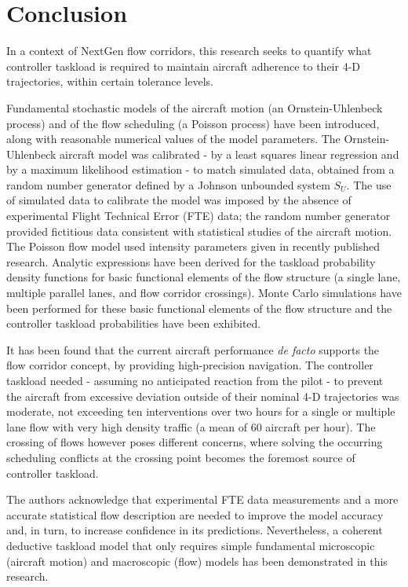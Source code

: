 \documentclass[conference]{IEEEtran}
\begin{document}
\section{Conclusion}

In a context of NextGen flow corridors, this research seeks to quantify what controller taskload is required to maintain aircraft adherence to their 4-D trajectories, within certain tolerance levels.

Fundamental stochastic models of the aircraft motion (an Ornstein-Uhlenbeck process) and of the flow scheduling (a Poisson process) have been introduced, along with reasonable numerical values of the model parameters. The Ornstein-Uhlenbeck aircraft model was calibrated - by a least squares linear regression and by a maximum likelihood estimation - to match simulated data, obtained from a random number generator defined by a Johnson unbounded system $S_U$. The use of simulated data to calibrate the model was imposed by the absence of experimental Flight Technical Error (FTE) data; the random number generator provided fictitious data consistent with statistical studies of the aircraft motion. The Poisson flow model used intensity parameters given in recently published research. Analytic expressions have been derived for the taskload probability density functions for basic functional elements of the flow structure (a single lane, multiple parallel lanes, and flow corridor crossings). Monte Carlo simulations have been performed for these basic functional elements of the flow structure and the controller taskload probabilities have been exhibited.

It has been found that the current aircraft performance \emph{de facto} supports the flow corridor concept, by providing high-precision navigation. The controller taskload needed - assuming no anticipated reaction from the pilot - to prevent the aircraft from excessive deviation outside of their nominal 4-D trajectories was moderate, not exceeding ten interventions over two hours for a single or multiple lane flow with very high density traffic (a mean of 60 aircraft per hour). The crossing of flows however poses different concerns, where solving the occurring scheduling conflicts at the crossing point becomes the foremost source of controller taskload.

The authors acknowledge that experimental FTE data measurements and a more accurate statistical flow description are needed to improve the model accuracy and, in turn, to increase confidence in its predictions. Nevertheless, a coherent deductive taskload model that only requires simple fundamental microscopic (aircraft motion) and macroscopic (flow) models has been demonstrated in this research.
\end{document}
